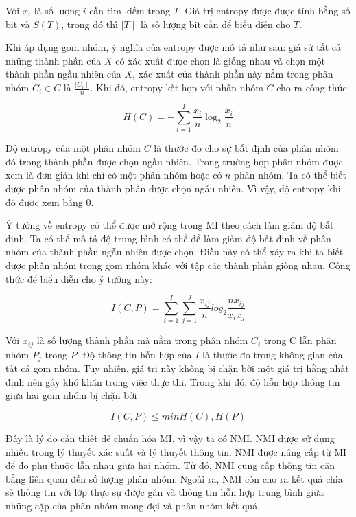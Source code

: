 Với $x_i$ là số lượng $i$ cần tìm kiếm trong $T$.
Giá trị entropy được được tính bằng số bit và $S(T)$, trong đó thì $\mid T \mid$ là số lượng bit cần để biểu diễn cho $T$.

Khi áp dụng gom nhóm, ý nghĩa của entropy được mô tả như sau: giả sử tất cả những thành phần của $X$ có xác xuất được chọn là giống nhau và chọn một thành phần ngẫu nhiên của $X$, xác xuất của thành phần này nằm trong phân nhóm $C_i \in C$ là $\frac{\mid C_i \mid}{n}$.
Khi đó, entropy kết hợp với phân nhóm $C$ cho ra công thức:
\begin{center}
\begin{equation}
H (C) = - \sum^{I}_{i = 1} \frac{x_i}{n} \log_2 \frac{x_i}{n}
\end{equation}
\end{center}

Độ entropy của một phân nhóm $C$ là thước đo cho sự bất định của phân nhóm đó trong thành phần được chọn ngẫu nhiên.
Trong trường hợp phân nhóm được xem là đơn giản khi chỉ có một phân nhóm hoặc có $n$ phân nhóm.
Ta có thể biết được phân nhóm của thành phần được chọn ngẫu nhiên.
Vì vậy, độ entropy khi đó được xem bằng $0$.

Ý tưởng về entropy có thể được mở rộng trong MI theo cách làm giảm độ bất định.
Ta có thể mô tả độ trung bình có thể để làm giảm độ bất định về phân nhóm của thành phần ngẫu nhiên được chọn.
Điều này có thể xảy ra khi ta biết được phân nhóm trong gom nhóm khác với tập các thành phần giống nhau.
Công thức để biểu diễn cho ý tưởng này:
\begin{center}
\begin{equation}
I (C, P) = \sum_{i=1}^I \sum_{j=1}^J \frac{x_{ij}}{n} log_2 \frac{n x_{ij}}{x_i x_j}
\end{equation}
\end{center}

Với $x_{ij}$ là số lượng thành phần mà nằm trong phân nhóm $C_i$ trong C lẫn phân nhóm $P_j$ trong $P$.
Độ thông tin hỗn hợp của $I$ là thước đo trong không gian của tất cả gom nhóm.
Tuy nhiên, giá trị này không bị chặn bởi một giá trị hằng nhất định nên gây khó khăn trong việc thực thi. Trong khi đó, độ hỗn hợp thông tin giữa hai gom nhóm bị chặn bởi 
\begin{center}
\begin{equation}
I (C, P) \leq min{H(C), H(P)}
\end{equation}
\end{center}

Đây là lý do cần thiết đẻ chuẩn hóa MI, vì vậy ta có NMI.
NMI được sử dụng nhiều trong lý thuyết xác suất và lý thuyết thông tin.
NMI được nâng cấp từ MI để đo phụ thuộc lẫn nhau giữa hai nhóm.
Từ đó, NMI cung cấp thông tin cân bằng liên quan đến số lượng phân nhóm.
Ngoài ra, NMI còn cho ra kết quả chia sẻ thông tin với lớp thực sự được gán và thông tin hỗn hợp trung bình giữa những cặp của phân nhóm mong đợi và phân nhóm kết quả.
		
